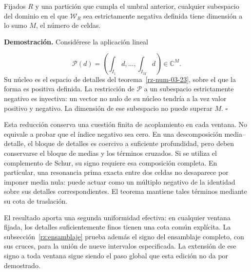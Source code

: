 Fijados \(R\) y una partición que cumpla el umbral anterior, cualquier subespacio del dominio en el que \(\mathscr W_R\) sea estrictamente negativa definida tiene dimensión a lo sumo \(M\), el número de celdas.

\textbf{Demostración.} Considérese la aplicación lineal

\[
\mathcal P(d)=\left(\int_{I_1}d,\ldots,
\int_{I_M}d\right)\in\mathbb C^M.
\]
Su núcleo es el espacio de detalles del teorema~\ref{rz-num-03-23}, sobre el que la forma es positiva definida. La restricción de \(\mathcal P\) a un subespacio estrictamente negativo es inyectiva: un vector no nulo de su núcleo tendría a la vez valor positivo y negativo. La dimensión de ese subespacio no puede superar \(M\). \hfill\(\square\)

Esta reducción conserva una cuestión finita de acoplamiento en cada ventana. No equivale a probar que el índice negativo sea cero. En una descomposición media–detalle, el bloque de detalles es coercivo a suficiente profundidad, pero deben conservarse el bloque de medias y los términos cruzados. Si se utiliza el complemento de Schur, su signo requiere esa composición completa. En particular, una resonancia prima exacta entre dos celdas no desaparece por imponer media nula: puede actuar como un múltiplo negativo de la identidad sobre sus detalles correspondientes. El teorema mantiene tales términos mediante su cota de traslación.

El resultado aporta una segunda uniformidad efectiva: en cualquier ventana fijada, los detalles suficientemente finos tienen una cota común explícita. La subsección~\ref{rz:ensamblaje} prueba además el signo del ensamblaje completo, con sus cruces, para la unión de nueve intervalos especificada. La extensión de ese signo a toda ventana sigue siendo el paso global que esta edición no da por demostrado.

